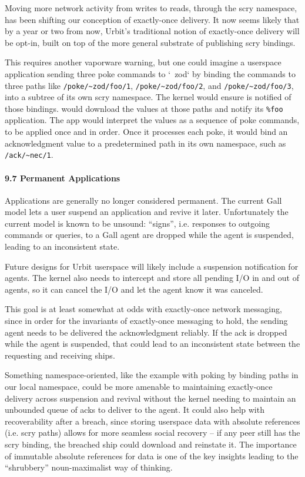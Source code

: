 \documentclass[twoside]{article}
\begin{document}
Moving more network activity from writes to reads, through the scry namespace, has been shifting our conception of exactly-once delivery.  It now seems likely that by a year or two from now, Urbit's traditional notion of exactly-once delivery will be opt-in, built on top of the more general substrate of publishing scry bindings.

This requires another vaporware warning, but one could imagine a userspace application sending three poke commands to `~zod` by binding the commands to three paths like \lstinline[style=inlinecode]{/poke/~zod/foo/1}, \lstinline[style=inlinecode]{/poke/~zod/foo/2}, and \lstinline[style=inlinecode]{/poke/~zod/foo/3}, into a subtree of its own scry namespace.  The kernel would ensure  is notified of those bindings.   would download the values at those paths and notify its \lstinline[style=inlinecode]{%foo} application.  The app would interpret the values as a sequence of poke commands, to be applied once and in order.  Once it processes each poke, it would bind an acknowledgment value to a predetermined path in its own namespace, such as \lstinline[style=inlinecode]{/ack/~nec/1}.

\paragraph{9.7 Permanent Applications}  Applications are generally no longer considered permanent.  The current Gall model lets a user suspend an application and revive it later.  Unfortunately the current model is known to be unsound: ``signs'', i.e. responses to outgoing commands or queries, to a Gall agent are dropped while the agent is suspended, leading to an inconsistent state.

Future designs for Urbit userspace will likely include a suspension notification for agents.  The kernel also needs to intercept and store all pending I/O in and out of agents, so it can cancel the I/O and let the agent know it was canceled.

This goal is at least somewhat at odds with exactly-once network messaging, since in order for the invariants of exactly-once messaging to hold, the sending agent needs to be delivered the acknowledgment reliably.  If the ack is dropped while the agent is suspended, that could lead to an inconsistent state between the requesting and receiving ships.  

Something namespace-oriented, like the example with poking  by binding paths in our local namespace, could be more amenable to maintaining exactly-once delivery across suspension and revival without the kernel needing to maintain an unbounded queue of acks to deliver to the agent.  It could also help with recoverability after a breach, since storing userspace data with absolute references (i.e. scry paths) allows for more seamless social recovery – if any peer still has the scry binding, the breached ship could download and reinstate it.  The importance of immutable absolute references for data is one of the key insights leading to the ``shrubbery'' noun-maximalist way of thinking.
\end{document}
